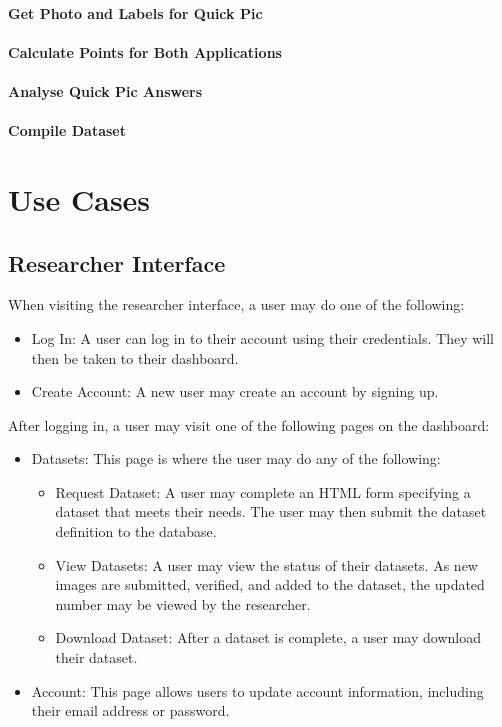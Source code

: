 \documentclass{article}
\begin{document}
\paragraph{Get Photo and Labels for Quick Pic}

\paragraph{Calculate Points for Both Applications}

\paragraph{Analyse Quick Pic Answers}

\paragraph{Compile Dataset}

\section{Use Cases}
\subsection{Researcher Interface}
When visiting the researcher interface, a user may do one of the following:
\begin{itemize}
\item Log In: A user can log in to their account using their credentials. They will then be taken to their dashboard.
\item Create Account: A new user may create an account by signing up.
\end{itemize}

After logging in, a user may visit one of the following pages on the dashboard:
\begin{itemize}
\item Datasets: This page is where the user may do any of the following:
\begin{itemize}
\item Request Dataset: A user may complete an HTML form specifying a dataset that meets their needs. The user may then submit the dataset definition to the database.
\item View Datasets: A user may view the status of their datasets. As new images are submitted, verified, and added to the dataset, the updated number may be viewed by the researcher.
\item Download Dataset: After a dataset is complete, a user may download their dataset.
\end{itemize}
\item Account: This page allows users to update account information, including their email address or password.

\end{itemize}
\end{document}
